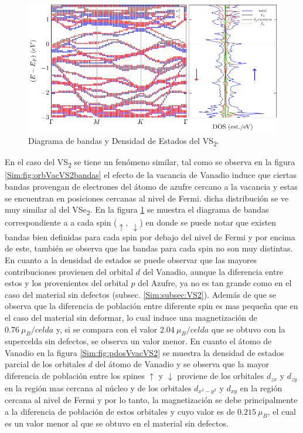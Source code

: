 \begin{figure}[!hbt]
	\centering
	\includegraphics[scale=1]{figRes/VS2/def/bandas/nosoc/bandasDOSnoSoc.pdf}
	\caption[Diagrama de bandas  y densidad de estados en el VS\textsubscript{2} con vacancia de Vanadio]{Diagrama de bandas y Densidad de Estados del  VS\textsubscript{2}.}
	\label{Sim:fig:VacVS2bandas}
\end{figure}
\par En el caso del VS\textsubscript{2} se tiene un fen\'omeno similar, tal como se observa en la figura \ref{Sim:fig:orbVacVS2bandas} el efecto de la vacancia de Vanadio induce que  ciertas bandas provengan de electrones del \'atomo de azufre cercano a la vacancia y estas se encuentran en posiciones cercanas al nivel de Fermi. dicha distribuci\'on se ve muy similar al del VSe\textsubscript{2}. En la figura \ref{Sim:fig:VacVS2bandas} se muestra el diagrama de bandas correspondiente a a cada spin ($\uparrow,~ \downarrow$) en donde se puede notar que existen bandas bien definidas  para cada spin por debajo del nivel de Fermi y por encima de este, tambi\'en se observa que las bandas para cada spin no son muy distintas. En cuanto a la densidad de estados se puede observar  que las mayores contribuciones provienen del orbital $d$ del Vanadio, aunque la diferencia entre estos y los provenientes del orbital $p$ del Azufre, ya no es tan grande como en el caso del material sin defectos (subsec. \ref{Sim:subsec:VS2}). Adem\'as de que se observa que la diferencia de poblaci\'on entre diferente spin es mas peque\~na que en el caso del material sin deformar, lo cual induce  una magnetizaci\'on de $0.76 ~\mu_B/celda$ y, si se compara con el valor $2.04 ~\mu_B/celda$  que se obtuvo con la supercelda sin defectos, se observa un valor menor. En cuanto el \'atomo de Vanadio en la figura \ref{Sim:fig:pdosVvacVS2} se muestra la densidad de estados parcial de los orbitales $d$ del \'atomo de Vanadio y se observa que la mayor diferencia de poblaci\'on entre los spines $\uparrow$ y $\downarrow$ proviene de los orbitales $d_{zx}$ y $d_{zy}$ en la regi\'on mas cercana al n\'ucleo y de los orbitales $d_{x^2-y^2}$ y $d_{xy}$ en la regi\'on cercana al nivel de Fermi y por lo tanto, la magnetizaci\'on se debe principalmente a la diferencia de poblaci\'on  de estos orbitales y cuyo valor es de $0.215~\mu_{B}$, el cual es un valor menor al que se obtuvo en el material sin defectos.
